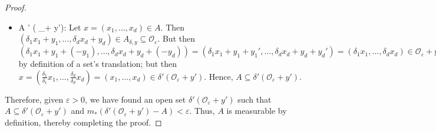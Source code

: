 \begin{proof}
\begin{itemize}
	\item A \subseteq \delta ' ( _\varepsilon + y')\): Let \( x = (x_1, \hdots , x_d) \in A \). Then \( (\delta_1 x_1 + y_1, \hdots , \delta_d x_d + y_d) \in A_{\delta ,y} \subseteq \mathcal{O}_\varepsilon   \). But then \( (\delta_1 x_1 + y_1 + (- y_1), \hdots , \delta_d x_d + y_d + (- y_d)) = (\delta_1 x_1 +y_1+y_1', \hdots , \delta_d x_d +y_d+y_d' ) = (\delta_1x_1, \hdots , \delta _d x_d ) \in \mathcal{O}_\varepsilon + y' \) by definition of a set's translation; but then \( x = (\frac{\delta _1}{\delta _1} x_1, \hdots ,\frac{\delta_d}{\delta_d }  x_d) = (x_1, \hdots , x_d) \in \delta ' (\mathcal{O} _\varepsilon + y')  \). Hence, \( A \subseteq  \delta ' (\mathcal{O} _\varepsilon + y')\).
\end{itemize}
Therefore, given \( \varepsilon > 0 \), we have found an open set \(  \delta ' (\mathcal{O} _\varepsilon + y') \) such that \( A \subseteq  \delta ' (\mathcal{O} _\varepsilon + y') \) and \( m_*( \delta ' (\mathcal{O} _\varepsilon + y') - A) < \varepsilon   \). Thus, \( A \) is measurable by definition, thereby completing the proof.
\end{proof}
